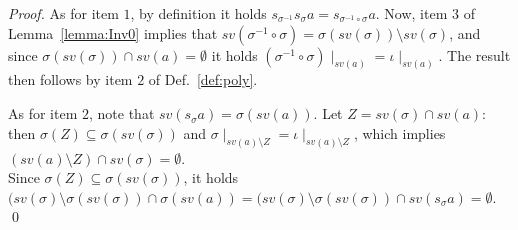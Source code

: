 \documentclass{llncs}
\def\monop{\otimes}
\begin{document}
\begin{proof}
	As for item $1$, by definition it holds $s_{\sigma^{-1}} s_{\sigma} a = s_{\sigma^{-1} \circ \sigma} a$. Now, item $3$ of Lemma~\ref{lemma:Inv0} implies that $sv(\sigma^{-1} \circ \sigma) = \sigma(sv(\sigma)) \setminus sv(\sigma)$, and since $\sigma(sv(\sigma)) \cap sv(a) = \emptyset$ it holds $(\sigma^{-1} \circ \sigma) \mid _{sv(a)} = \iota \mid _{sv(a)}$.
	The result then follows by item $2$ of Def.~\ref{def:poly}.
	
	As for item $2$, note that $sv(s_{\sigma} a) = \sigma(sv(a))$. Let $Z = sv(\sigma) \cap sv(a)$: then $\sigma(Z) \subseteq \sigma(sv(\sigma))$ and $\sigma \mid_{sv(a) \setminus Z} = \iota \mid_{sv(a) \setminus Z}$, which implies $(sv(a) \setminus Z) \cap sv(\sigma) = \emptyset$.\\
	Since $\sigma(Z) \subseteq \sigma(sv(\sigma))$, it holds $(sv(\sigma) \setminus \sigma(sv(\sigma)) \cap \sigma(sv(a)) = (sv(\sigma) \setminus \sigma(sv(\sigma)) \cap sv(s_{\sigma} a) = \emptyset$.
\qed	
\end{proof}
\end{document}
